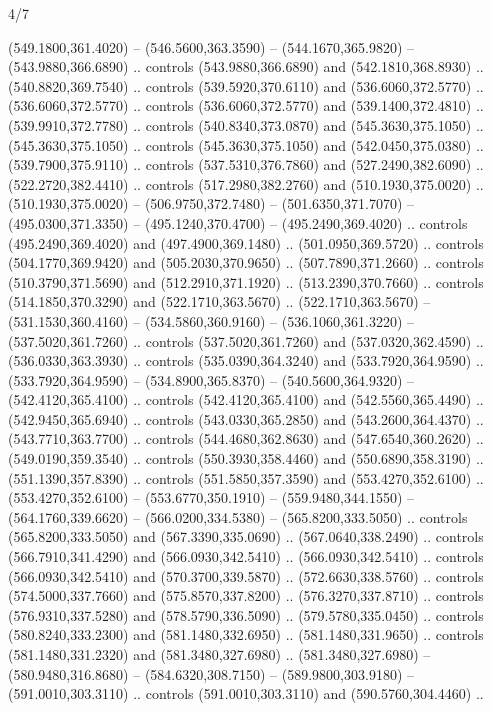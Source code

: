 \begin{flagdescription}{4/7}
\begin{scope}[shift={(0.5\flaglength,0.5\flagwidth)},scale=\flagwidth*\stretchfactor/820]
\begin{scope}[scale=1.87,xshift=-138mm,yshift=75mm]
\begin{scope}[y=0.8pt, x=0.8pt, yscale=-1, xscale=1]
\begin{scope}[fill=c9ca168]
  (549.1800,361.4020) -- (546.5600,363.3590) -- (544.1670,365.9820) --
  (543.9880,366.6890) .. controls (543.9880,366.6890) and (542.1810,368.8930) ..
  (540.8820,369.7540) .. controls (539.5920,370.6110) and (536.6060,372.5770) ..
  (536.6060,372.5770) .. controls (536.6060,372.5770) and (539.1400,372.4810) ..
  (539.9910,372.7780) .. controls (540.8340,373.0870) and (545.3630,375.1050) ..
  (545.3630,375.1050) .. controls (545.3630,375.1050) and (542.0450,375.0380) ..
  (539.7900,375.9110) .. controls (537.5310,376.7860) and (527.2490,382.6090) ..
  (522.2720,382.4410) .. controls (517.2980,382.2760) and (510.1930,375.0020) ..
  (510.1930,375.0020) -- (506.9750,372.7480) -- (501.6350,371.7070) --
  (495.0300,371.3350) -- (495.1240,370.4700) -- (495.2490,369.4020) .. controls
  (495.2490,369.4020) and (497.4900,369.1480) .. (501.0950,369.5720) .. controls
  (504.1770,369.9420) and (505.2030,370.9650) .. (507.7890,371.2660) .. controls
  (510.3790,371.5690) and (512.2910,371.1920) .. (513.2390,370.7660) .. controls
  (514.1850,370.3290) and (522.1710,363.5670) .. (522.1710,363.5670) --
  (531.1530,360.4160) -- (534.5860,360.9160) -- (536.1060,361.3220) --
  (537.5020,361.7260) .. controls (537.5020,361.7260) and (537.0320,362.4590) ..
  (536.0330,363.3930) .. controls (535.0390,364.3240) and (533.7920,364.9590) ..
  (533.7920,364.9590) -- (534.8900,365.8370) -- (540.5600,364.9320) --
  (542.4120,365.4100) .. controls (542.4120,365.4100) and (542.5560,365.4490) ..
  (542.9450,365.6940) .. controls (543.0330,365.2850) and (543.2600,364.4370) ..
  (543.7710,363.7700) .. controls (544.4680,362.8630) and (547.6540,360.2620) ..
  (549.0190,359.3540) .. controls (550.3930,358.4460) and (550.6890,358.3190) ..
  (551.1390,357.8390) .. controls (551.5850,357.3590) and (553.4270,352.6100) ..
  (553.4270,352.6100) -- (553.6770,350.1910) -- (559.9480,344.1550) --
  (564.1760,339.6620) -- (566.0200,334.5380) -- (565.8200,333.5050) .. controls
  (565.8200,333.5050) and (567.3390,335.0690) .. (567.0640,338.2490) .. controls
  (566.7910,341.4290) and (566.0930,342.5410) .. (566.0930,342.5410) .. controls
  (566.0930,342.5410) and (570.3700,339.5870) .. (572.6630,338.5760) .. controls
  (574.5000,337.7660) and (575.8570,337.8200) .. (576.3270,337.8710) .. controls
  (576.9310,337.5280) and (578.5790,336.5090) .. (579.5780,335.0450) .. controls
  (580.8240,333.2300) and (581.1480,332.6950) .. (581.1480,331.9650) .. controls
  (581.1480,331.2320) and (581.3480,327.6980) .. (581.3480,327.6980) --
  (580.9480,316.8680) -- (584.6320,308.7150) -- (589.9800,303.9180) --
  (591.0010,303.3110) .. controls (591.0010,303.3110) and (590.5760,304.4460) ..

\end{scope}
\end{scope}
\end{scope}
\end{scope}
\end{flagdescription}
